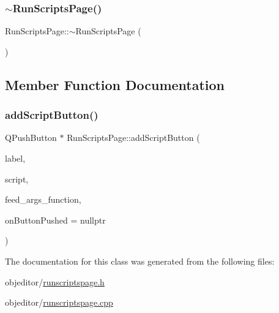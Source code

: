 \mbox{\label{class_run_scripts_page_af2e07024df0bdb72c31277a979f13287}} 
\subsubsection{\texorpdfstring{$\sim$RunScriptsPage()}{~RunScriptsPage()}}
{\footnotesize\ttfamily Run\+Scripts\+Page\+::$\sim$\+Run\+Scripts\+Page (\begin{DoxyParamCaption}{ }\end{DoxyParamCaption})}



\subsection{Member Function Documentation}
\mbox{\label{class_run_scripts_page_ab41d6b1a13175ac06d9c7c6732404b2f}} 
\subsubsection{\texorpdfstring{addScriptButton()}{addScriptButton()}}
{\footnotesize\ttfamily Q\+Push\+Button $\ast$ Run\+Scripts\+Page\+::add\+Script\+Button (\begin{DoxyParamCaption}\item[{const Q\+String \&}]{label,  }\item[{const Q\+String \&}]{script,  }\item[{\mbox{\hyperlink{class_run_scripts_page_a74087fa5854e30f514a6e807bf55ca69}{Feed\+Args\+Function}}}]{feed\+\_\+args\+\_\+function,  }\item[{\mbox{\hyperlink{class_run_scripts_page_ab4304d9dd110792503447f673b7e6a3b}{Button\+Pushed\+Function}}}]{on\+Button\+Pushed = {\ttfamily nullptr} }\end{DoxyParamCaption})}



The documentation for this class was generated from the following files\+:\begin{DoxyCompactItemize}
\item 
objeditor/\mbox{\hyperlink{runscriptspage_8h}{runscriptspage.\+h}}\item 
objeditor/\mbox{\hyperlink{runscriptspage_8cpp}{runscriptspage.\+cpp}}\end{DoxyCompactItemize}
